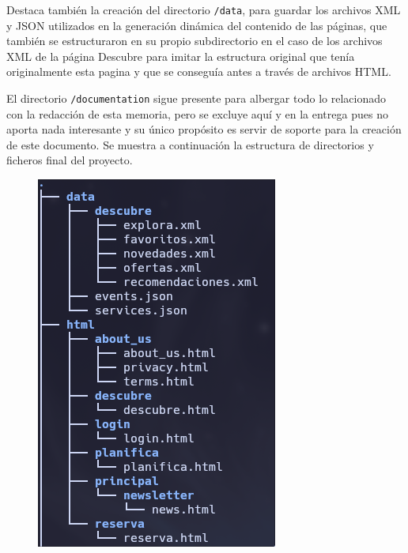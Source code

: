 \documentclass[11pt, a4paper]{book}
\begin{document}
    Destaca también la creación del directorio \texttt{/data}, para guardar los archivos XML y JSON utilizados en la generación dinámica del contenido de las páginas, que también se estructuraron en su propio subdirectorio en el caso de los archivos XML de la página Descubre para imitar la estructura original que tenía originalmente esta pagina y que se conseguía antes a través de archivos HTML. 

    El directorio \texttt{/documentation} sigue presente para albergar todo lo relacionado con la redacción de esta memoria, pero se excluye aquí y en la entrega pues no aporta nada interesante y su único propósito es servir de soporte para la creación de este documento. Se muestra a continuación la estructura de directorios y ficheros final del proyecto.

	\begin{figure} [h]
		\centering
		\begin{minipage}[c]{0.25\textwidth}
			\centering
			\includegraphics[width=\textwidth]{estructura_ficheros_final1.png}

\end{minipage}
\end{figure}
\end{document}
